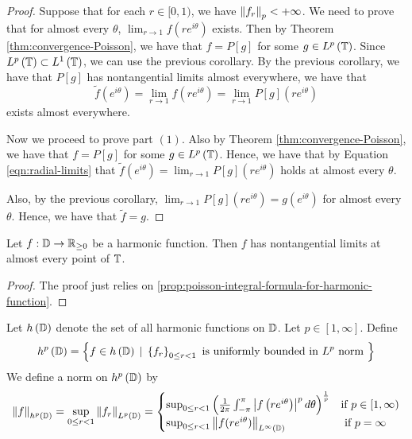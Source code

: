\begin{proof}
    Suppose that for each $r\in [0,1)$, we have $\left\lVert f_{r} \right\rVert_{p} < +\infty$. We need to prove that for almost every $\theta$, $\lim_{r\to 1} f\left( re^{i\theta} \right)$ exists. Then by Theorem \ref{thm:convergence-Poisson}, we have that $f=P[g]$ for some $g\in L^{p} \left( \mathbb T \right)$. Since $L^{p} \left( \mathbb T \right) \subset L^{1} \left( \mathbb T \right)$, we can use the previous corollary. By the previous corollary, we have that $P[g]$ has nontangential limits almost everywhere, we have that
    \begin{equation}
	\tilde{f} \left( e^{i\theta} \right) = \lim_{r\to 1} f(re^{i\theta}) = \lim_{r\to 1} P[g] \left( re^{i\theta} \right)
	\label{eqn:radial-limits}
    \end{equation}
    exists almost everywhere.

    Now we proceed to prove part $(1)$. Also by Theorem \ref{thm:convergence-Poisson}, we have that $f=P[g]$ for some $g\in L^{p} \left( \mathbb T \right)$. Hence, we have that by Equation \ref{eqn:radial-limits} that $\tilde{f} (e^{i\theta}) =  \lim_{r\to 1} P[g] \left( re^{i\theta} \right)$ holds at almost every $\theta$.

    Also, by the previous corollary, $\lim_{r\to 1} P[g] \left( re^{i\theta} \right) = g(e^{i\theta})$ for almost every $\theta$. Hence, we have that $\tilde{f} = g$.

\end{proof}

\begin{corollary}
    Let $f: \mathbb D \to \mathbb R_{\ge 0}$ be a harmonic function. Then $f$ has nontangential limits at almost every point of $\mathbb T$.
    \label{cor:nontangential-limits}
\end{corollary}
\begin{proof}
    The proof just relies on \ref{prop:poisson-integral-formula-for-harmonic-function}.
\end{proof}

Let $h \left( \mathbb D \right)$ denote the set of all harmonic functions on $\mathbb D$. Let $p\in [1,\infty]$. Define
\begin{equation*}
    h^{p} \left( \mathbb D \right) = \left\{ f\in h \left( \mathbb D \right) \, \mid \, \left\{ f_{r} \right\}_{0\le r < 1} \text{ is uniformly bounded in } L^{p} \text{ norm }\right\}
\end{equation*}
We define a norm on $h^{p} \left( \mathbb D \right)$ by
\begin{equation*}
    \left\lVert f \right\rVert_{h^{p} \left( \mathbb D \right)} = \sup_{0\le r < 1} \left\lVert f_{r} \right\rVert_{L^p \left( \mathbb D \right)} =\begin{cases} \sup_{0\le r < 1} \left( \frac{1}{2\pi} \int_{-\pi}^{\pi} \left\lvert f\left( re^{i\theta}\right) \right\rvert^{p}d\theta   \right)^{\frac{1}{p}} & \text{if } p \in [1, \infty) \\
	\sup_{0\le r < 1} \left\lVert f(re^{i\theta}) \right\rVert_{L^{\infty} \left( \mathbb D \right)} & \text{ if } p=\infty
    \end{cases}
\end{equation*}

